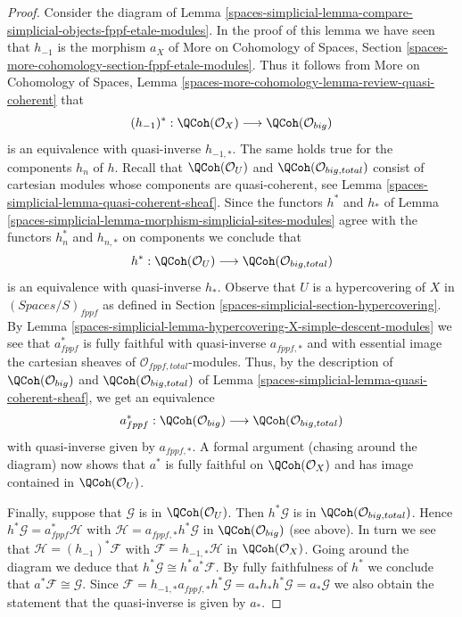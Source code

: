 \begin{proof}
Consider the diagram of
Lemma \ref{spaces-simplicial-lemma-compare-simplicial-objects-fppf-etale-modules}.
In the proof of this lemma we have seen that
$h_{-1}$ is the morphism $a_X$ of
More on Cohomology of Spaces, Section
\ref{spaces-more-cohomology-section-fppf-etale-modules}.
Thus it follows from
More on Cohomology of Spaces, Lemma
\ref{spaces-more-cohomology-lemma-review-quasi-coherent}
that
$$
(h_{-1})^* :
\QCoh(\mathcal{O}_X)
\longrightarrow
\QCoh(\mathcal{O}_{big})
$$
is an equivalence with quasi-inverse $h_{-1, *}$.
The same holds true for the components $h_n$ of $h$.
Recall that $\QCoh(\mathcal{O}_U)$ and $\QCoh(\mathcal{O}_{big, total})$
consist of cartesian modules whose components are quasi-coherent, see
Lemma \ref{spaces-simplicial-lemma-quasi-coherent-sheaf}.
Since the functors $h^*$ and $h_*$ of
Lemma \ref{spaces-simplicial-lemma-morphism-simplicial-sites-modules}
agree with the functors $h_n^*$ and $h_{n, *}$ on components
we conclude that
$$
h^* :
\QCoh(\mathcal{O}_U)
\longrightarrow
\QCoh(\mathcal{O}_{big, total})
$$
is an equivalence with quasi-inverse $h_*$.
Observe that $U$ is a hypercovering of $X$ in $(\textit{Spaces}/S)_{fppf}$
as defined in Section \ref{spaces-simplicial-section-hypercovering}.
By Lemma \ref{spaces-simplicial-lemma-hypercovering-X-simple-descent-modules}
we see that $a_{fppf}^*$ is fully faithful with quasi-inverse
$a_{fppf, *}$ and with essential image the cartesian sheaves
of $\mathcal{O}_{fppf, total}$-modules.
Thus, by the description of $\QCoh(\mathcal{O}_{big})$ and
$\QCoh(\mathcal{O}_{big, total})$ of Lemma \ref{spaces-simplicial-lemma-quasi-coherent-sheaf},
we get an equivalence
$$
a_{fppf}^* :
\QCoh(\mathcal{O}_{big})
\longrightarrow
\QCoh(\mathcal{O}_{big, total})
$$
with quasi-inverse given by $a_{fppf, *}$.
A formal argument (chasing around the diagram) now shows that
$a^*$ is fully faithful on $\QCoh(\mathcal{O}_X)$ and has
image contained in $\QCoh(\mathcal{O}_U)$.

\medskip\noindent
Finally, suppose that $\mathcal{G}$ is in $\QCoh(\mathcal{O}_U)$.
Then $h^*\mathcal{G}$ is in $\QCoh(\mathcal{O}_{big, total})$.
Hence $h^*\mathcal{G} = a_{fppf}^*\mathcal{H}$ with
$\mathcal{H} = a_{fppf, *}h^*\mathcal{G}$
in $\QCoh(\mathcal{O}_{big})$ (see above).
In turn we see that $\mathcal{H} = (h_{-1})^*\mathcal{F}$
with $\mathcal{F} = h_{-1, *}\mathcal{H}$ in $\QCoh(\mathcal{O}_X)$.
Going around the diagram we deduce that
$h^*\mathcal{G} \cong h^*a^*\mathcal{F}$.
By fully faithfulness of $h^*$ we conclude that
$a^*\mathcal{F} \cong \mathcal{G}$.
Since $\mathcal{F} = h_{-1, *}a_{fppf, *}h^*\mathcal{G} =
a_*h_*h^*\mathcal{G} = a_*\mathcal{G}$ we also obtain
the statement that the quasi-inverse is given by $a_*$.
\end{proof}

